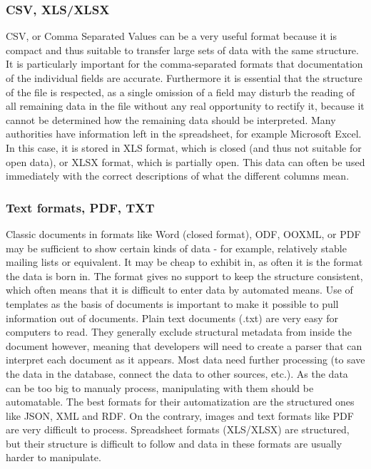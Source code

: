 \documentclass[thesis=B,english]{FITthesis}[2012/06/26]
\begin{document}
		\subsubsection{CSV, XLS/XLSX}
		CSV, or Comma Separated Values can be a very useful format because it is compact and thus suitable to transfer large sets of data with the same structure. It is particularly important for the comma-separated formats that documentation of the individual fields are accurate.
Furthermore it is essential that the structure of the file is respected, as a single omission of a field may disturb the reading of all remaining data in the file without any real opportunity to rectify it, because it cannot be determined how the remaining data should be interpreted.
Many authorities have information left in the spreadsheet, for example Microsoft Excel. In this case, it is stored in XLS format, which is closed (and thus not suitable for open data), or XLSX format, which is partially open. This data can often be used immediately with the correct descriptions of what the different columns mean.
		\subsubsection{Text formats, PDF, TXT}
		Classic documents in formats like Word (closed format), ODF, OOXML, or PDF may be sufficient to show certain kinds of data - for example, relatively stable mailing lists or equivalent. It may be cheap to exhibit in, as often it is the format the data is born in. The format gives no support to keep the structure consistent, which often means that it is difficult to enter data by automated means. Use of templates as the basis of documents is important to make it possible to pull information out of documents.
Plain text documents (.txt) are very easy for computers to read. They generally exclude structural metadata from inside the document however, meaning that developers will need to create a parser that can interpret each document as it appears.
\linebreak \linebreak \linebreak
Most data need further processing (to save the data in the database, connect the data to other sources, etc.). As the data can be too big to manualy process, manipulating with them should be automatable. The best formats for their automatization are the structured ones like JSON, XML and RDF. On the contrary, images and text formats like PDF are very difficult to process. Spreadsheet formats (XLS/XLSX) are structured, but their structure is difficult to follow and data in these formats are usually harder to manipulate.
\end{document}

